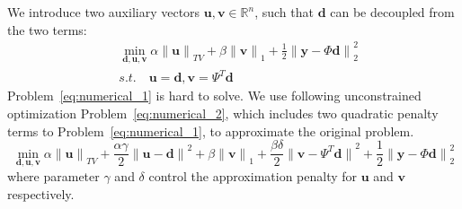 \documentclass[preprint,10pt,5p,times,twocolumn]{elsarticle}
\begin{document}
We introduce two auxiliary vectors $\mathbf{u},\mathbf{v}\in{\mathbb{R}}^{n}$, such that $\mathbf{d}$ can be decoupled from the two terms:
\begin{equation}
\begin{split}
\label{eq:numerical_1}
&\min_{\mathbf{d},\mathbf{u},\mathbf{v}}{\alpha{\|\mathbf{u}\|}_{TV}+\beta{\|\mathbf{v}\|}_{1}}+\frac{1}{2}{\|\mathbf{y} - \Phi\mathbf{d}\|}_{2}^{2} \\
&s.t. \quad \mathbf{u}=\mathbf{d},\mathbf{v} = \Psi^{T}\mathbf{d}
\end{split}
\end{equation}
Problem~\eqref{eq:numerical_1} is hard to solve. We use following unconstrained optimization Problem~\eqref{eq:numerical_2}, which includes two quadratic penalty terms to Problem~\eqref{eq:numerical_1}, to approximate the original problem.
\begin{equation}
\label{eq:numerical_2}
\min_{\mathbf{d},\mathbf{u},\mathbf{v}}{\alpha{\|\mathbf{u}\|}_{TV}+\frac{\alpha\gamma}{2}{\|\mathbf{u}-\mathbf{d}\|}^2+\beta{\|\mathbf{v}\|}_{1}}+\frac{\beta\delta}{2}{\|\mathbf{v}-\Psi^{T}\mathbf{d}\|}^2+\frac{1}{2}{\|\mathbf{y} - \Phi\mathbf{d}\|}_{2}^{2}
\end{equation}
where parameter $\gamma$ and $\delta$ control the approximation penalty for $\mathbf{u}$ and $\mathbf{v}$ respectively.
\end{document}
